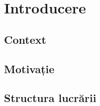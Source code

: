 \chapter{Introducere}
\label{cap:Introducere}
\section{Context}
\section{Motivație}
\section{Structura lucrării}